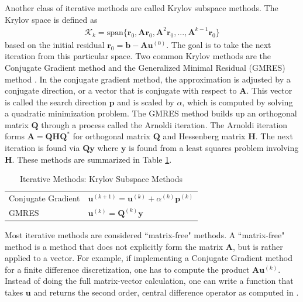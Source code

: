 Another class of iterative methods are called Krylov subspace methods. The Krylov space is defined as
\begin{align}
\mathcal{K}_k = \text{span} \{ \textbf{r}_0, \textbf{A} \textbf{r}_0, \textbf{A}^2 \textbf{r}_0, ..., \textbf{A}^{k-1} \textbf{r}_0 \}
\end{align}
based on the initial residual $\textbf{r}_0 = \textbf{b} - \textbf{A} \textbf{u}^{(0)}$. The goal is to take the next iteration from this particular space. Two common Krylov methods are the Conjugate Gradient method \citep{hestenes1952methods} and the Generalized Minimal Residual (GMRES) method \citep{saad1986gmres}. In the conjugate gradient method, the approximation is adjusted by a conjugate direction, or a vector that is conjugate with respect to $\textbf{A}$. This vector is called the search direction $\textbf{p}$ and is scaled by $\alpha$, which is computed by solving a quadratic minimization problem. The GMRES method builds up an orthogonal matrix $\textbf{Q}$ through a process called the Arnoldi iteration. The Arnoldi iteration forms $\textbf{A} = \textbf{Q} \textbf{H} \textbf{Q}^*$ for orthogonal matrix $\textbf{Q}$ and Hessenberg matrix $\textbf{H}$. The next iteration is found via $\textbf{Q} \textbf{y}$ where $\textbf{y}$ is found from a least squares problem involving $\textbf{H}$. These methods are summarized in Table \ref{tab:ksm}.

\begin{table}[h!]
    \centering
    \begin{tabular}{ | l | l |}
        \hline
        Conjugate Gradient & $\textbf{u}^{(k+1)} = \textbf{u}^{(k)} + \alpha^{(k)} \textbf{p}^{(k)}$ \\
        GMRES & $\textbf{u}^{(k)} = \textbf{Q}^{(k)} \textbf{y}$ \\
        \hline
    \end{tabular}
    \caption{Iterative Methods: Krylov Subspace Methods}
    \label{tab:ksm}
\end{table}

Most iterative methods are considered ``matrix-free" methods. A ``matrix-free" method is a method that does not explicitly form the matrix $\textbf{A}$, but is rather applied to a vector. For example, if implementing a Conjugate Gradient method for a finite difference discretization, one has to compute the product $\textbf{A} \textbf{u}^{(k)}$. Instead of doing the full matrix-vector calculation, one can write a function that takes $\textbf{u}$ and returns the second order, central difference operator as computed in .

